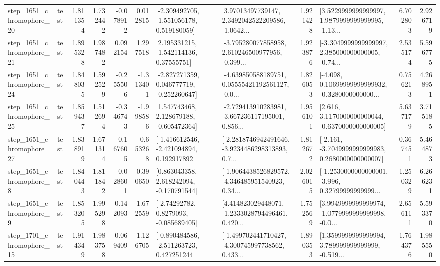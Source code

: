 \begin{tabular}{llrrrrllrlrr}
 step\_1651\_chromophore\_20 &      test &      1.811354 &    1.732442 &     -0.078912 &  0.012815 &   [-2.309492705, -1.551056178, 0.519180059] &  [3.97013497739147, 2.3492042522209586, -1.0642... &       1.921428 &  [3.5229999999999997, 1.9879999999999995, -1.13... &            6.702803 &          2.926719 \\
 step\_1651\_chromophore\_21 &      test &      1.895328 &    1.987482 &      0.092154 &  1.297518 &     [2.195331215, -1.542114136, 0.37555751] &  [-3.795280077858958, 2.610246500977956, -0.399... &       1.923876 &  [-3.3049999999999997, 2.385000000000005, -0.74... &            2.535174 &          5.596775 \\
 step\_1651\_chromophore\_24 &      test &      1.848035 &    1.592529 &     -0.255506 & -1.313401 &   [-2.827271359, 0.046777719, -0.252260647] &  [-4.639850588189751, 0.05555421192561127, -0.0... &       1.826053 &  [-4.098, 0.10699999999999932, -0.3280000000000... &            0.756213 &          4.268951 \\
 step\_1651\_chromophore\_25 &      test &      1.859437 &    1.512694 &     -0.346743 & -1.998586 &    [1.547743468, 2.128679188, -0.605472364] &  [-2.729413910283981, -3.667236117195001, 0.856... &       1.956101 &   [2.616, 3.1170000000000044, -0.6370000000000005] &            5.637179 &          3.715185 \\
 step\_1651\_chromophore\_27 &      test &      1.838919 &    1.671314 &     -0.167605 & -0.653268 &   [-1.416612546, -2.421094894, 0.192917892] &  [-2.2818746942491646, -3.9234486298313893, 0.7... &       1.812672 &  [-2.161, -3.7049999999999983, 0.2680000000000007] &            0.367451 &          5.464873 \\
  step\_1651\_chromophore\_8 &      test &      1.840443 &    1.811842 &     -0.028601 &  0.390650 &    [0.863043358, 2.618242094, -0.170791544] &  [-1.9064438526829572, -4.346485951540923, 0.34... &       2.026015 &  [-1.2530000000000001, -3.996, 0.32799999999999... &            1.250329 &          6.266231 \\
  step\_1651\_chromophore\_9 &      test &      1.853205 &    1.995298 &      0.142093 &  1.672559 &      [-2.74292782, 0.8279093, -0.085689405] &  [4.414823029448071, -1.2333028794496461, 0.420... &       1.752569 &  [3.9949999999999974, -1.0779999999999998, -0.0... &            2.656111 &          5.593370 \\
 step\_1701\_chromophore\_15 &      test &      1.914349 &    1.983758 &      0.069409 &  1.126705 &   [-0.890484586, -2.511263723, 0.427251244] &  [-1.499702441710427, -4.300745997738562, 0.433... &       1.890353 &  [1.3599999999999994, 3.789999999999999, -0.519... &            1.764376 &          1.985550 \\

\end{tabular}
